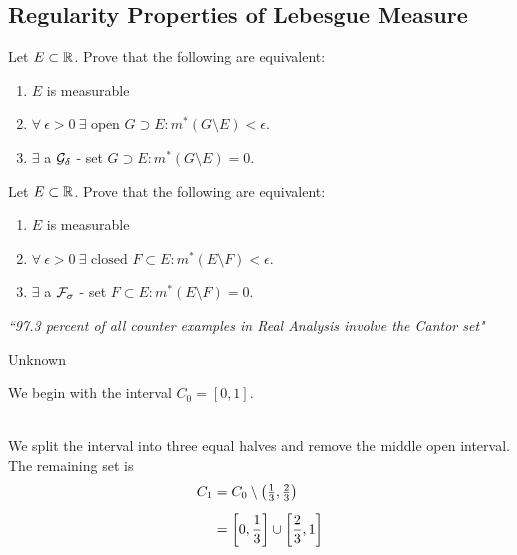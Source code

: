 \documentclass[a4paper]{book}
\begin{document}
\subsection{Regularity Properties of Lebesgue Measure}
\begin{theorem}
Let $E \subset \mathbb{R}$. Prove that the following are equivalent:
\begin{enumerate}
\item $E$ is measurable
\item $\forall\ \epsilon>0\ \exists \text{ open } G \supset E : m^*(G \setminus E) <  \epsilon$.
\item $\exists$ a $\mathcal{G}_\delta$ - set $G \supset E : m^*(G \setminus E) = 0$. 
\end{enumerate}
\end{theorem}
\begin{theorem}
Let $E \subset \mathbb{R}$. Prove that the following are equivalent:
\begin{enumerate}
\item $E$ is measurable
\item $\forall\ \epsilon>0\ \exists \text{ closed } F \subset E : m^*(E \setminus F) <  \epsilon$.
\item $\exists$ a $\mathcal{F}_\sigma$ - set $F \subset E : m^*(E \setminus F) = 0$. 
\end{enumerate}
\end{theorem}
\newpage
{}
\vspace{-10pt}
\epigraph{\em ``97.3 percent of all counter examples in Real Analysis involve the Cantor set"}{Unknown}
\noindent We begin with the interval $C_0 = [0,1]$. \\
\begin{figure}[h]
\centering
{}
\end{figure} \\
We split the interval into three equal halves and remove the middle open interval. The remaining set is 
\begin{align*}
C_1 &= C_0 \setminus \qty(\tfrac13,\tfrac23) \\[5pt]
&= \qty[0,\frac13] \cup \qty[\frac23, 1]
\end{align*}
\begin{figure}[h!]
\centering
{}
\end{figure} \\
\end{document}
